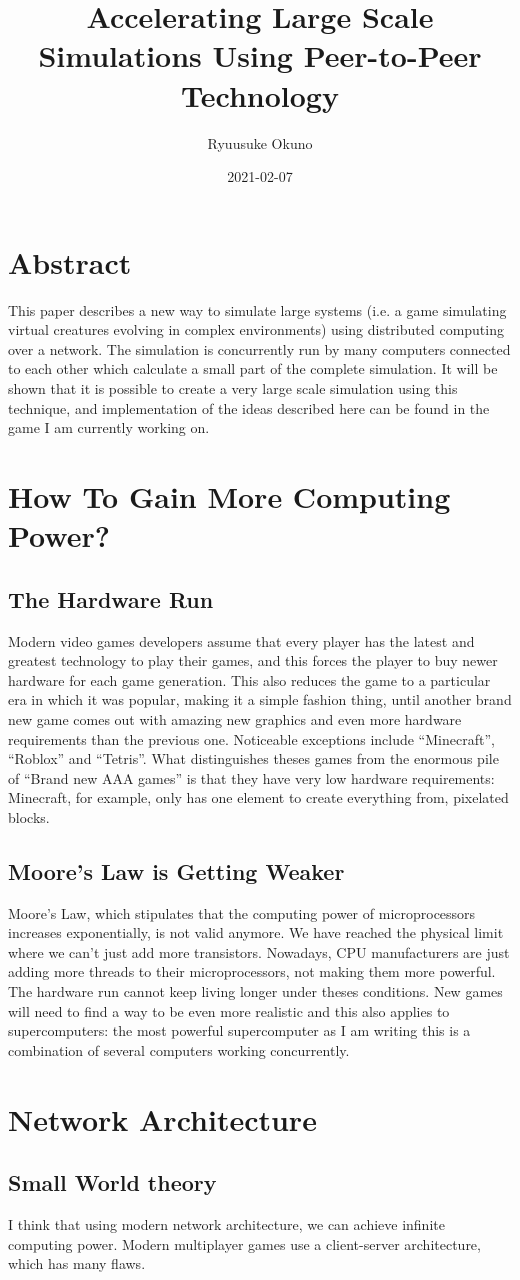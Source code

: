 \documentclass{article}
\title{Accelerating Large Scale Simulations Using Peer-to-Peer Technology}
\date{2021-02-07}
\author{Ryuusuke Okuno}
\begin{document}
\maketitle
{}
\newpage
{}

\section{Abstract}
This paper describes a new way to simulate large systems (i.e. a game
simulating virtual creatures evolving in complex environments) using
distributed computing over a network. The simulation is concurrently
run by many computers connected to each other which calculate a small
part of the complete simulation. It will be shown that it is possible
to create a very large scale simulation using this technique, and
implementation of the ideas described here can be found in the game I
am currently working on.

\section{How To Gain More Computing Power?}
\subsection{The Hardware Run}
Modern video games developers assume that every player has the latest
and greatest technology to play their games, and this forces the
player to buy newer hardware for each game generation. This also
reduces the game to a particular era in which it was popular, making
it a simple fashion thing, until another brand new game comes out with
amazing new graphics and even more hardware requirements than the
previous one. Noticeable exceptions include ``Minecraft'', ``Roblox''
and ``Tetris''. What distinguishes theses games from the enormous pile
of ``Brand new AAA games'' is that they have very low hardware
requirements: Minecraft, for example, only has one element to create
everything from, pixelated blocks.

\subsection{Moore's Law is Getting Weaker}
Moore's Law, which stipulates that the computing power of
microprocessors increases exponentially, is not valid anymore. We have
reached the physical limit where we can't just add more
transistors. Nowadays, CPU manufacturers are just adding more threads
to their microprocessors, not making them more powerful. The hardware
run cannot keep living longer under theses conditions. New games will
need to find a way to be even more realistic and this also applies to
supercomputers: the most powerful supercomputer as I am writing this
is a combination of several computers working concurrently.

\section{Network Architecture}
\subsection{Small World theory}
I think that using modern network architecture, we can achieve
infinite computing power. Modern multiplayer games use a
client-server architecture, which has many flaws.
\end{document}
